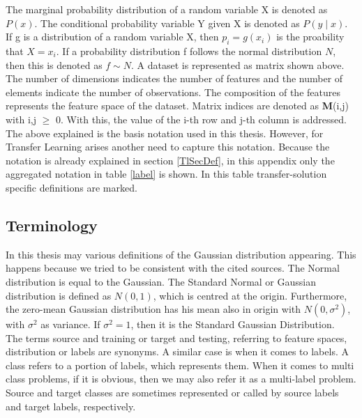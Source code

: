 The marginal probability distribution of a random variable X is denoted as $P(x)$.
The conditional probability variable Y given X is denoted as $P(y \mid x)$.
If g is a distribution of a random variable X, then $p_i=g(x_i)$ is the proability that $X=x_i$.
If a probability distribution f follows the normal distribution $N$, then this is denoted as $f\sim N$.\newline
A dataset is represented as matrix shown above.
The number of dimensions indicates the number of features and the number of elements indicate the number of observations.
The composition of the features represents the feature space of the dataset.
Matrix indices are denoted as \textbf{M}(i,j) with i,j $\ge$ 0.
With this, the value of the i-th row and j-th column is addressed.\\
The above explained is the basis notation used in this thesis. 
However, for Transfer Learning arises another need to capture this notation.
Because the notation is already explained in section \ref{TlSecDef}, in this appendix only the aggregated notation in table \ref{label} is shown.
In this table transfer-solution specific definitions are marked.

\subsection{Terminology}
In this thesis may various definitions of the Gaussian distribution appearing.
This happens because we tried to be consistent with the cited sources.
The Normal distribution is equal to the Gaussian.
The Standard Normal or Gaussian distribution is defined as $N(0,1)$, which is centred at the origin.
Furthermore, the zero-mean Gaussian distribution has his mean also in origin with $N(0,\sigma^2)$, with $\sigma^2$ as variance.
If $\sigma^2=1$, then it is the Standard Gaussian Distribution.\\
The terms source and training or target and testing, referring to feature spaces, distribution or labels are synonyms.
A similar case is when it comes to labels. A class refers to a portion of labels, which represents them. 
When it comes to multi class problems, if it is obvious, then we may also refer it as a multi-label problem.
Source and target classes are sometimes represented or called by source labels and target labels, respectively.
\clearpage
\newpage
